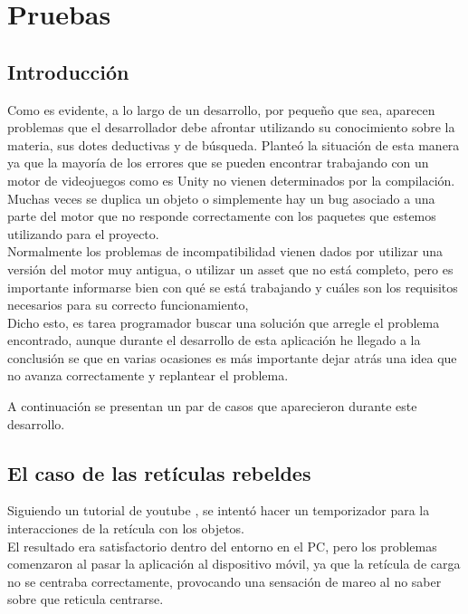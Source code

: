 \section{Pruebas}

\subsection{Introducción}

\quad Como es evidente, a lo largo de un desarrollo, por pequeño que sea, aparecen problemas que el desarrollador debe afrontar utilizando su conocimiento sobre la materia, sus dotes deductivas y de búsqueda. Planteó la situación de esta manera ya que la mayoría de los errores que se pueden encontrar trabajando con un motor de videojuegos como es Unity no vienen determinados por la compilación. Muchas veces se duplica un objeto o simplemente hay un bug asociado a una parte del motor que no responde correctamente con los paquetes que estemos utilizando para el proyecto.\\

\quad Normalmente los problemas de incompatibilidad vienen dados por utilizar una versión del motor muy antigua, o utilizar un asset que no está completo, pero es importante informarse bien con qué se está trabajando y cuáles son los requisitos necesarios para su correcto funcionamiento,\\

\quad Dicho esto, es tarea programador buscar una solución que arregle el problema encontrado, aunque durante el desarrollo de esta aplicación he llegado a la conclusión se que en varias ocasiones es más importante dejar atrás una idea que no avanza correctamente y replantear el problema.\

\quad A continuación se presentan un par de casos que aparecieron durante este desarrollo.\\

\subsection{El caso de las retículas rebeldes}

\quad Siguiendo un tutorial de youtube \cite{You}, se intentó hacer un temporizador para la interacciones de la retícula con los objetos.\\

\quad El resultado era satisfactorio dentro del entorno en el PC, pero los problemas comenzaron al pasar la aplicación al dispositivo móvil, ya que la retícula de carga no se centraba correctamente, provocando una sensación de mareo al no saber sobre que reticula centrarse.\\

